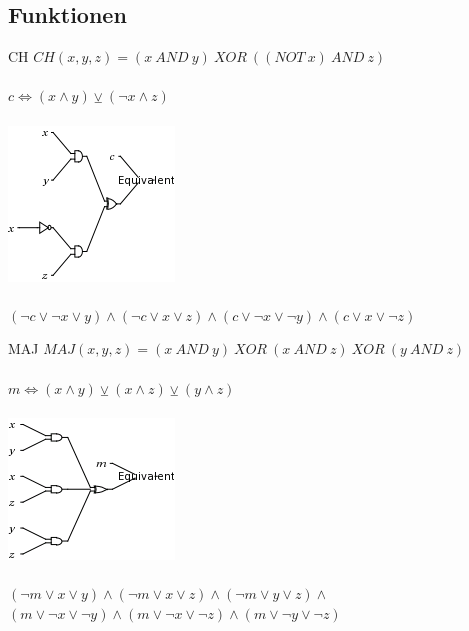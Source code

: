 \documentclass{beamer}
\begin{document}
  \subsection{Funktionen}
    \begin{frame}{CH}
      $ CH( x, y, z) = (x~AND~y)~XOR~( (NOT~x)~AND~z) $\\
      ~\\
      $ c \Leftrightarrow (x \wedge y) \veebar ( \neg x \wedge z) $\\
      ~\\
      \includegraphics[scale=0.5]{ch.png}\\
      ~\\
      $ (\neg c \vee \neg x \vee y) \wedge (\neg c \vee x \vee z) \wedge (c \vee \neg x \vee \neg y) \wedge (c \vee x \vee \neg z) $
    \end{frame}
    \begin{frame}{MAJ}
      $ MAJ( x, y, z) = (x~AND~y)~XOR~(x~AND~z)~XOR~(y~AND~z) $\\
      ~\\
      $ m \Leftrightarrow (x \wedge y) \veebar (x \wedge z) \veebar (y \wedge z) $\\
      ~\\
      \includegraphics[scale=0.5]{maj.png}\\
      ~\\
      $ (\neg m \vee x \vee y) \wedge  (\neg m \vee x \vee z) \wedge (\neg m \vee y \vee z) \wedge $\\
      $ (m \vee \neg x \vee \neg y) \wedge (m \vee \neg x \vee \neg z) \wedge (m \vee \neg y \vee \neg z) $
      \end{frame}
\end{document}
